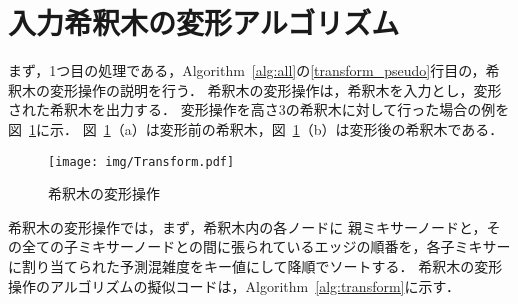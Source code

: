 \section{入力希釈木の変形アルゴリズム}
まず，1つ目の処理である，Algorithm~\ref{alg:all}の\ref{transform_pseudo}行目の，希釈木の変形操作の説明を行う． 希釈木の変形操作は，希釈木を入力とし，変形された希釈木を出力する． 変形操作を高さ3の希釈木に対して行った場合の例を図~\ref{fig:Transform}に示．
図~\ref{fig:Transform}（a）は変形前の希釈木，図~\ref{fig:Transform}（b）は変形後の希釈木である．

\begin{figure}[tbp]
 \centering\texttt{[image: img/Transform.pdf]}
 \caption{希釈木の変形操作}\label{fig:Transform}
\end{figure}

希釈木の変形操作では，まず，希釈木内の各ノードに
親ミキサーノードと，その全ての子ミキサーノードとの間に張られているエッジの順番を，各子ミキサーに割り当てられた予測混雑度をキー値にして降順でソートする． 
希釈木の変形操作のアルゴリズムの擬似コードは，Algorithm~\ref{alg:transform}に示す．

